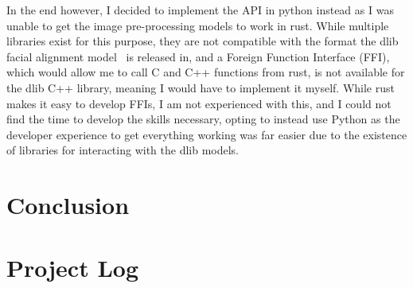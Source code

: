 \documentclass{report}
\begin{document}
In the end however, I decided to implement the API in python instead as I was unable to get the image pre-processing models to work in rust. While multiple libraries exist for this purpose, they are not compatible with the format the dlib facial alignment model~\cite{king2009dlib} is released in, and a Foreign Function Interface (FFI), which would allow me to call C and C++ functions from rust, is not available for the dlib C++ library, meaning I would have to implement it myself. While rust makes it easy to develop FFIs, I am not experienced with this, and I could not find the time to develop the skills necessary, opting to instead use Python as the developer experience to get everything working was far easier due to the existence of libraries for interacting with the dlib models.

\chapter{Conclusion}

\printbibliography

\appendix 

\chapter{Project Log}
\end{document}
